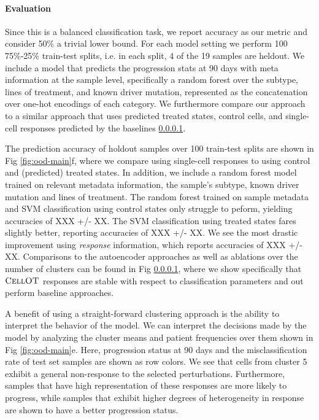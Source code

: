 \paragraph{Evaluation}
Since this is a balanced classification task, we report accuracy as our metric and consider 50\% a trivial lower bound.
For each model setting we perform 100 75\%-25\% train-test splits, i.e. in each split, 4 of the 19 samples are heldout.
We include a model that predicts the progression stats at 90 days with meta information at the sample level, specifically a random forest over the subtype, lines of treatment, and known driver mutation, represented as the concatenation over one-hot encodings of each category.
We furthermore compare our approach to a similar approach that uses predicted treated states, control cells, and single-cell responses predicted by the baselines \ref{}.

The prediction accuracy of holdout samples over 100 train-test splits are shown in Fig \ref{fig:ood-main}f, where we compare using single-cell responses to using control and (predicted) treated states.
In addition, we include a random forest model trained on relevant metadata information, the sample’s subtype, known driver mutation and lines of treatment.
The random forest trained on sample metadata and SVM classification using control states only struggle to peform, yielding accuracies of XXX +/- XX.
The SVM classification using treated states fares slightly better, reporting accuracies of XXX +/- XX.
We see the most drastic improvement using \emph{response} information, which reports accuracies of XXX +/- XX.
Comparisons to the autoencoder approaches as well as ablations over the number of clusters can be found in Fig \ref{}, where we show specifically that $\textsc{CellOT}$ responses are stable with respect to classification parameters and out perform baseline approaches.

A benefit of using a straight-forward clustering approach is the ability to interpret the behavior of the model.
We can interpret the decisions made by the model by analyzing the cluster means and patient frequencies over them shown in Fig \ref{fig:ood-main}e.
Here, progression status at 90 days and the misclassification rate of test set samples are shown as row colors.
We see that cells from cluster 5 exhibit a general non-response to the selected perturbations.
Furthermore, samples that have high representation of these responses are more likely to progress,
while samples that exhibit higher degrees of heterogeneity in response are shown to have a better progression status.

